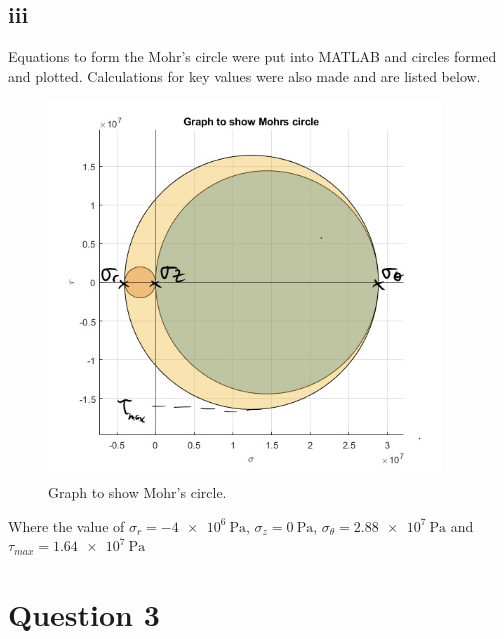 \documentclass[11pt]{article}
\numberwithin{equation}{section}
\begin{document}
\subsection{iii}
Equations to form the Mohr's circle were put into MATLAB and circles formed and plotted. Calculations for key values were also made and are listed below.

\begin{figure}[H]
    \centering
    \includegraphics[height = 10cm]{./img/Inkedq2iii1_LI.jpg}
    \caption{Graph to show Mohr's circle.}
    \label{fig:q2iii}
\end{figure}
Where the value of $\sigma_r = \SI{-4e6}{\pascal}$, $\sigma_z = \SI{0}{\pascal}$, $\sigma_{\theta} = \SI{2.88e7}{\pascal}$ and $\tau_{max} = \SI{1.64e7}{\pascal}$
\section{Question 3}
\end{document}

